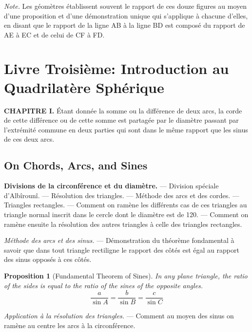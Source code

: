 \documentclass[11pt,a4paper]{article}
\theoremstyle{plain}
\newtheorem{proposition}{Proposition}[section]
\theoremstyle{definition}
\theoremstyle{remark}
\begin{document}
\noindent\textit{Note.} Les géomètres établissent souvent le rapport de ces douze figures au moyen d'une proposition et d'une démonstration unique qui s'applique à chacune d'elles, en disant que le rapport de la ligne AB à la ligne BD est composé du rapport de AE à EC et de celui de CF à FD.


\clearpage

\section{Livre Troisième: Introduction au Quadrilatère Sphérique}
\label{sec:livre3}


\textbf{CHAPITRE I.} Étant donnée la somme ou la différence de deux arcs, la corde de cette différence ou de cette somme est partagée par le diamètre passant par l'extrémité commune en deux parties qui sont dans le même rapport que les sinus de ces deux arcs.


\subsection{On Chords, Arcs, and Sines}
\label{sec:chords-arcs}


\textbf{Divisions de la circonférence et du diamètre.} --- Division spéciale d'Albîrounî. --- Résolution des triangles. --- Méthode des arcs et des cordes. --- Triangles rectangles. --- Comment on ramène les différents cas de ces triangles au triangle normal inscrit dans le cercle dont le diamètre est de 120. --- Comment on ramène ensuite la résolution des autres triangles à celle des triangles rectangles.

\textit{Méthode des arcs et des sinus.} --- Démonstration du théorème fondamental à savoir que dans tout triangle rectiligne le rapport des côtés est égal au rapport des sinus opposés à ces côtés.


\begin{proposition}[Fundamental Theorem of Sines]
In any plane triangle, the ratio of the sides is equal to the ratio of the sines of the opposite angles.
\[
\frac{a}{\sin A} = \frac{b}{\sin B} = \frac{c}{\sin C}
\]
\end{proposition}


\textit{Application à la résolution des triangles.} --- Comment au moyen des sinus on ramène au centre les arcs à la circonférence.
\end{document}
